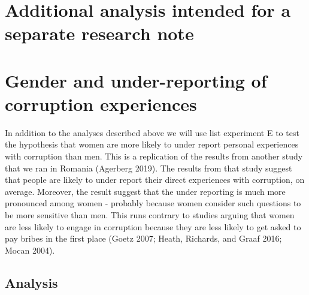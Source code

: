\documentclass[]{article}
\begin{document}
\hypertarget{additional-analysis-intended-for-a-separate-research-note-1}{%
\section{Additional analysis intended for a separate research
note}\label{additional-analysis-intended-for-a-separate-research-note-1}}

\hypertarget{gender-and-under-reporting-of-corruption-experiences}{%
\section{Gender and under-reporting of corruption
experiences}\label{gender-and-under-reporting-of-corruption-experiences}}

In addition to the analyses described above we will use list experiment
E to test the hypothesis that women are more likely to under report
personal experiences with corruption than men. This is a replication of
the results from another study that we ran in Romania (Agerberg 2019).
The results from that study suggest that people are likely to under
report their direct experiences with corruption, on average. Moreover,
the result suggest that the under reporting is much more pronounced
among women - probably because women consider such questions to be more
sensitive than men. This runs contrary to studies arguing that women are
less likely to engage in corruption because they are less likely to get
asked to pay bribes in the first place (Goetz 2007; Heath, Richards, and
Graaf 2016; Mocan 2004).

\hypertarget{analysis-1}{%
\subsection{Analysis}\label{analysis-1}}
\end{document}

